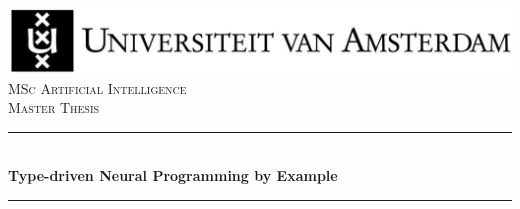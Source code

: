 
\newcommand{\red}[1]{{\color{red}{#1}}}




\begin{titlepage}

\newcommand{\HRule}{\rule{\linewidth}{0.5mm}} %
\center %
 

\includegraphics[width=\linewidth]{figures/uva.jpg}\\[2.5cm]
\textsc{\Large MSc Artificial Intelligence}\\[0.2cm]
\textsc{\Large Master Thesis}\\[0.5cm] 


\HRule \\[0.4cm]
{ \huge \bfseries
    Type-driven Neural Programming by Example \\
}%
\HRule \\[0.5cm]
 


\end{titlepage}
